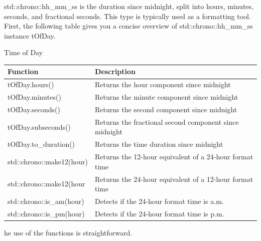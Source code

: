 std::chrono::hh\_mm\_ss is the duration since midnight, split into hours, minutes, seconds, and fractional seconds. This type is typically used as a formatting tool. First, the following table gives you a concise overview of std::chrono::hh\_mm\_ss instance tOfDay.

\begin{center}
Time of Day
\end{center}

\begin{table}[H]
\centering
\begin{tabular}{ll}
\textbf{Function}         & \textbf{Description}                        \\ \hline
tOfDay.hours()            & Returns the hour component since midnight   \\
tOfDay.minutes()          & Returns the minute component since midnight \\
tOfDay.seconds()          & Returns the second component since midnight \\
tOfDay.subseconds()       & Returns the fractional second component since midnight  \\
tOfDay.to\_duration()     & Returns the time duration since midnight    \\
std::chrono::make12(hour) & Returns the 12-hour equivalent of a 24-hour format time \\
std::chrono::make12(hour  & Returns the 24-hour equivalent of a 12-hour format time \\
std::chrono::is\_am(hour) & Detects if the 24-hour format time is a.m.  \\
std::chrono::is\_pm(hour) & Detects if the 24-hour format time is p.m. 
\end{tabular}
\end{table}


he use of the functions is straightforward.

